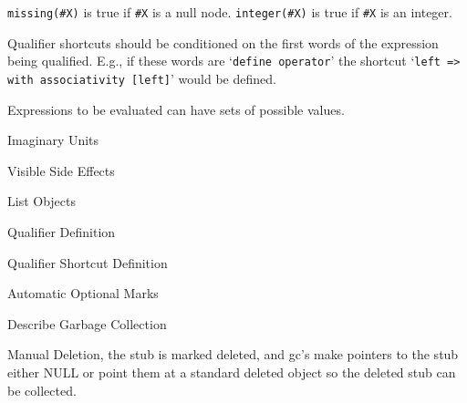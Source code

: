 \documentclass[12pt]{article}
\begin{document}
\verb|missing(#X)| is true if \verb|#X| is a null node.
\verb|integer(#X)| is true if \verb|#X| is an integer.

Qualifier shortcuts should be conditioned on the first words of
the expression being qualified.  E.g., if these words are
`\verb|define operator|' the shortcut `\verb|left => |{\tt with
associativity [left]}' would be defined.

Expressions to be evaluated can have sets of possible values.

Imaginary Units\label{IMAGINARY-UNITS}

Visible Side Effects\label{VISIBLE-SIDE-EFFECTS}

List Objects\label{LIST}

Qualifier Definition\label{QUALIFIER-DEFINITION}

Qualifier Shortcut Definition\label{QUALIFIER-SHORTCUT-DEFINITION}

Automatic Optional Marks\label{AUTOMATIC-OPTIONAL-MARKS}

Describe Garbage Collection\label{GARBAGE-COLLECTION}

Manual Deletion\label{MANUAL-DELETION}, the stub is marked deleted,
and gc's make pointers to the stub either NULL or point them at
a standard deleted object so the deleted stub can be collected.




\printindex
\end{document}
